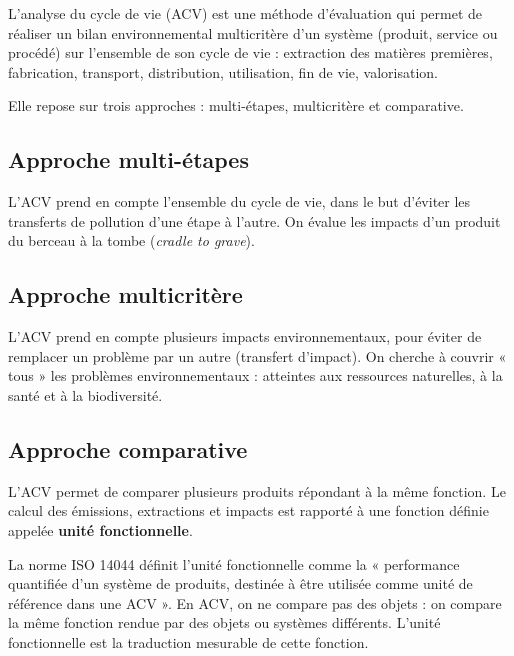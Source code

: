 L'analyse du cycle de vie (ACV) est une méthode d'évaluation qui permet de réaliser un bilan environnemental multicritère d'un système (produit, service ou procédé) sur l'ensemble de son cycle de vie : extraction des matières premières, fabrication, transport, distribution, utilisation, fin de vie, valorisation.

Elle repose sur trois approches : multi-étapes, multicritère et comparative.

\subsection*{Approche multi-étapes}
L'ACV prend en compte l'ensemble du cycle de vie, dans le but d'éviter les transferts de pollution d'une étape à l'autre. On évalue les impacts d'un produit du berceau à la tombe (\textit{cradle to grave}).


\subsection*{Approche multicritère}
L'ACV prend en compte plusieurs impacts environnementaux, pour éviter de remplacer un problème par un autre (transfert d'impact). On cherche à couvrir « tous » les problèmes environnementaux : atteintes aux ressources naturelles, à la santé et à la biodiversité.


\subsection*{Approche comparative}

L'ACV permet de comparer plusieurs produits répondant à la même fonction. Le calcul des émissions, extractions et impacts est rapporté à une fonction définie appelée \textbf{unité fonctionnelle}.

La norme ISO 14044 définit l'unité fonctionnelle comme la « performance quantifiée d'un système de produits, destinée à être utilisée comme unité de référence dans une ACV ». En ACV, on ne compare pas des objets : on compare la même fonction rendue par des objets ou systèmes différents. L'unité fonctionnelle est la traduction mesurable de cette fonction.

